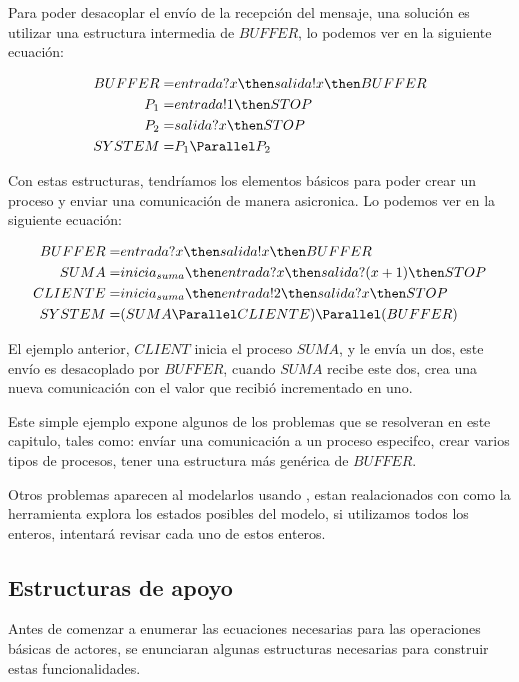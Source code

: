 Para poder desacoplar el envío de la recepción del mensaje, una solución es utilizar una estructura intermedia de $BUFFER$, lo podemos ver en la siguiente ecuación:

\begin{align*}
BUFFER =& entrada?x \then salida!x \then BUFFER \\
P_1 =& entrada!1 \then STOP \\
P_2 =& salida?x \then STOP \\
SYSTEM =& P_1 \Parallel P_2 \\
\end{align*}

Con estas estructuras, tendríamos los elementos básicos para poder crear un proceso y enviar una comunicación de manera asicronica. Lo podemos ver en la siguiente ecuación:

\begin{align*}
BUFFER =& entrada?x \then salida!x \then BUFFER\\
SUMA =& inicia_{suma} \then entrada?x \then salida?(x + 1) \then STOP \\
CLIENTE =& inicia_{suma}\then entrada!2 \then salida?x \then STOP \\
SYSTEM =& (SUMA \Parallel CLIENTE) \Parallel (BUFFER)\\
\end{align*}

El ejemplo anterior, $CLIENT$ inicia el proceso $SUMA$, y le envía un dos, este envío es desacoplado por $BUFFER$, cuando $SUMA$ recibe este dos, crea una nueva comunicación con el valor que recibió incrementado en uno.

Este simple ejemplo expone algunos de los problemas que se resolveran en este capitulo, tales como: envíar una comunicación a un proceso especifco, crear varios tipos de procesos, tener una estructura más genérica de $BUFFER$.

Otros problemas aparecen al modelarlos usando \FDR, estan realacionados con como la herramienta explora los estados posibles del modelo, si utilizamos todos los enteros, intentará revisar cada uno de estos enteros.

\subsection{Estructuras de apoyo}

Antes de comenzar a enumerar las ecuaciones necesarias para las operaciones básicas de actores, se enunciaran algunas estructuras necesarias para construir estas funcionalidades.

